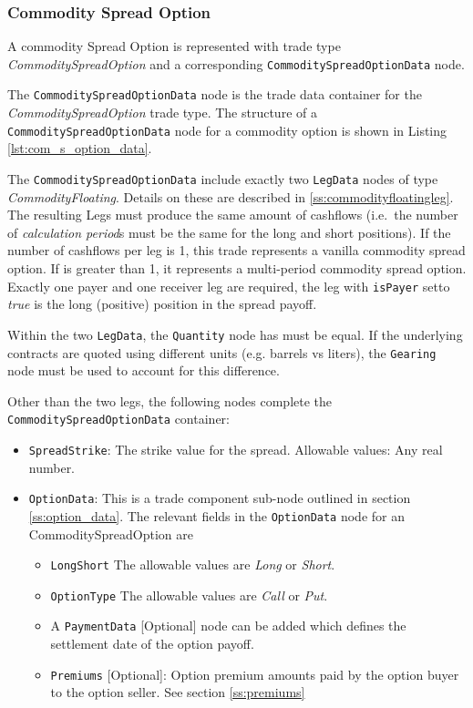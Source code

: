 \subsubsection{Commodity Spread Option}
\label{ss:input_commodity_spread_option}

A commodity Spread Option is represented with trade type  \emph{CommoditySpreadOption} and a corresponding
\lstinline!CommoditySpreadOptionData! node.

The \lstinline!CommoditySpreadOptionData! node is the trade data container for the \emph{CommoditySpreadOption} trade type.
The structure of a \lstinline!CommoditySpreadOptionData! node for a commodity option is shown in Listing \ref{lst:com_s_option_data}.

The \lstinline!CommoditySpreadOptionData! include exactly two \lstinline!LegData! nodes of type \emph{CommodityFloating}.
Details on these are described in \ref{ss:commodityfloatingleg}.
The resulting Legs must produce the same amount of cashflows (i.e.~the number of \emph{calculation period}s must be the same for the long and short positions).
If the number of cashflows per leg is 1, this trade represents a vanilla commodity spread option.
If is greater than 1, it represents a multi-period commodity spread option.
Exactly one payer and one receiver leg are required, the leg with \lstinline!isPayer! setto \emph{true} is the long (positive) position in the spread payoff. 

Within the two \lstinline!LegData!, the \lstinline!Quantity! node has must be equal.
If the underlying contracts are quoted using different units (e.g. barrels vs liters), the \lstinline!Gearing! node must be used to account for this difference.

Other than the two legs, the following nodes complete the \lstinline!CommoditySpreadOptionData! container:
\begin{itemize}
    \item \lstinline!SpreadStrike!: The strike value for the spread. Allowable values: Any real number.
    \item \lstinline!OptionData!: This is a trade component sub-node outlined in section \ref{ss:option_data}. 
The relevant fields in the \lstinline!OptionData! node for an CommoditySpreadOption are

\begin{itemize}
\item \lstinline!LongShort! The allowable values are \emph{Long} or \emph{Short}.

\item \lstinline!OptionType! The allowable values are \emph{Call} or \emph{Put}. 

\item A \lstinline!PaymentData! [Optional] node can be added which defines the settlement date of the option payoff.

\item \lstinline!Premiums! [Optional]: Option premium amounts paid by the option buyer to the option seller. See section \ref{ss:premiums}

\end{itemize}
\end{itemize}

